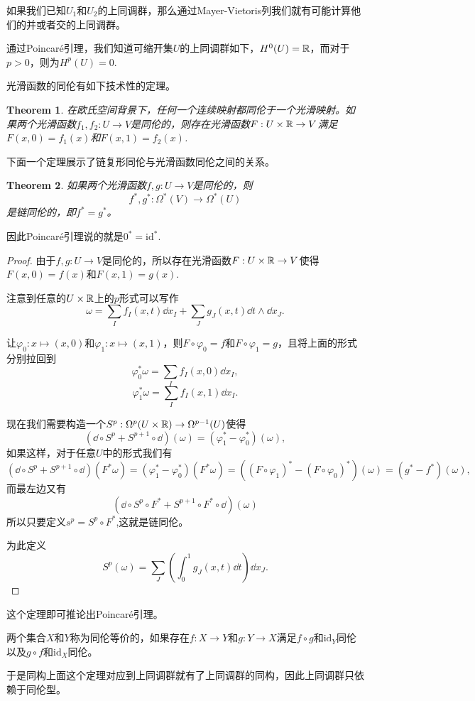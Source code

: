 \documentclass[11pt]{extbook}
\theoremstyle{plain}%
\newtheorem{theo}{Theorem}[section]%
\begin{document}
如果我们已知$U_1$和$U_2$的上同调群，那么通过Mayer-Vietoris列我们就有可能计算他们的并或者交的上同调群。

通过Poincaré引理，我们知道可缩开集$U$的上同调群如下，$H^0(U)=\mathbb{R}$，而对于$p>0$，则为$H^p(U)=0$.

光滑函数的同伦有如下技术性的定理。
\begin{theo}
在欧氏空间背景下，任何一个连续映射都同伦于一个光滑映射。如果两个光滑函数$f_1,f_2:U\to V$是同伦的，则存在光滑函数$F:U\times \mathbb{R}\to V$满足$F(x,0)=f_1(x)$和$F(x,1)=f_2(x)$.
\end{theo}

下面一个定理展示了链复形同伦与光滑函数同伦之间的关系。
\begin{theo}
如果两个光滑函数$f,g:U\to V$是同伦的，则
\[
f^*,g^*:\Omega^*(V)\to \Omega^*(U)
\]
是链同伦的，即$f^*=g^*$。
\end{theo}
因此Poincaré引理说的就是$0^*=\mathrm{id}^*$.
\begin{proof}
由于$f,g:U\to V$是同伦的，所以存在光滑函数$F:U\times \mathbb{R} \to V$使得$F(x,0)=f(x)$和$F(x,1)=g(x)$.

注意到任意的$U\times \mathbb{R}$上的$p$形式可以写作
\[
\omega=\sum_If_I(x,t)\dd x_I+\sum_J g_J(x,t)\dd t\wedge \dd x_J.
\]

让$\varphi_0:x\mapsto (x,0)$和$\varphi_1:x\mapsto (x,1)$，则$F\circ \varphi_0=f$和$F\circ \varphi_1=g$，且将上面的形式分别拉回到
\[
\varphi_0^*\omega=\sum_I f_I(x,0)\dd x_I,
\]
\[
\varphi_1^*\omega=\sum_I f_I(x,1)\dd x_I.
\]

现在我们需要构造一个$S^p:\Omega^p(U\times \mathbb{R})\to \Omega^{p-1}(U)$使得
\[
(\dd \circ S^p+S^{p+1}\circ \dd)(\omega)=(\varphi_1^*-\varphi_0^*)(\omega),
\]
如果这样，对于任意$U$中的形式我们有
\[
(\dd \circ S^p+S^{p+1}\circ \dd)(F^*\omega)=(\varphi_1^*-\varphi_0^*)(F^*\omega)=((F\circ \varphi_1)^*-(F\circ \varphi_0)^*)(\omega)=(g^*-f^*)(\omega),
\]
而最左边又有
\[
(\dd \circ S^p\circ F^*+S^{p+1}\circ F^* \circ \dd)(\omega)
\]
所以只要定义$s^p=S^p\circ F^*$,这就是链同伦。

为此定义
\[
S^p(\omega)=\sum_J\left(\int_0^1g_J(x,t)\dd t\right)\dd x_J.
\]
\end{proof}

这个定理即可推论出Poincaré引理。

两个集合$X$和$Y$称为同伦等价的，如果存在$f:X\to Y$和$g:Y\to X$满足$f\circ g$和$\mathrm{id}_Y$同伦以及$g\circ f$和$\mathrm{id}_X$同伦。

于是同构上面这个定理对应到上同调群就有了上同调群的同构，因此上同调群只依赖于同伦型。
\end{document}
